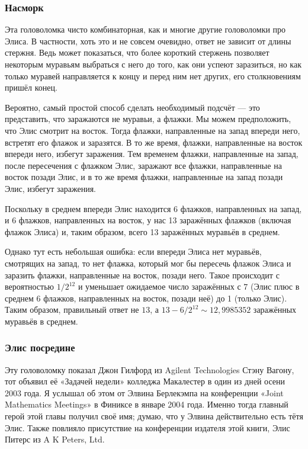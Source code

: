 \subsubsection*{Насморк}

Эта головоломка чисто комбинаторная, как и многие другие головоломки про Элиса.
В частности, хоть это и не совсем очевидно, ответ не зависит от длины стержня.
Ведь может показаться, что более короткий стержень позволяет некоторым муравьям выбраться с него до того, как они успеют заразиться, но как только муравей направляется к концу и перед ним нет других, его столкновениям пришёл конец.

Вероятно, самый простой способ сделать необходимый подсчёт --- это представить, что заражаются не муравьи, а флажки.
Мы можем предположить, что Элис смотрит на восток.
Тогда флажки, направленные на запад впереди него, встретят его флажок и заразятся.
В то же время, флажки, направленные на восток впереди него, избегут заражения.
Тем временем флажки, направленные на запад, после пересечения с флажком Элис, заражают все флажки, направленные на восток позади Элис, и в то же время флажки, направленные на запад позади Элис, избегут заражения.

Поскольку в среднем впереди Элис находится 6 флажков, направленных на запад, и 6 флажков, направленных на восток, у нас 13 заражённых флажков (включая флажок Элиса) и, таким образом, всего 13 заражённых муравьёв в среднем.

Однако тут есть небольшая ошибка: если впереди Элиса нет муравьёв, смотрящих на запад, то нет флажка, который мог бы пересечь флажок Элиса и заразить флажки, направленные на восток, позади него.
Такое происходит с вероятностью $1/2^{12}$ и уменьшает ожидаемое число заражённых с $7$ (Элис плюс в среднем 6 флажков, направленных на восток, позади неё) до 1 (только Элис).
Таким образом, правильный ответ не $13$, а $13 - 6/2^{12} \sim 12{,}9985352$ заражённых муравьёв в среднем.

\subsubsection*{Элис посредине}

Эту головоломку показал Джон Гилфорд из Agilent Technologies Стэну Вагону,
тот объявил её «Задачей недели» колледжа Макалестер в один из дней осени 2003 года.
Я услышал об этом от Элвина Берлекэмпа на конференции «Joint Mathematics Meetings» в Финиксе в январе 2004 года.
Именно тогда главный герой этой главы получил своё имя;
думаю, что у Элвина действительно есть тётя Элис.
Также повлияло присутствие на конференции издателя этой книги, Элис Питерс из A K Peters, Ltd.

